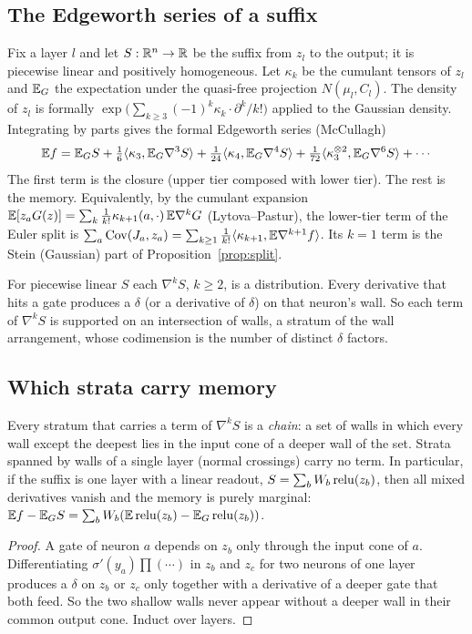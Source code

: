\label{sec:coupling}
\subsection{The Edgeworth series of a suffix}
Fix a layer $l$ and let $S:\mathbb R^n\to\mathbb R$ be the suffix from $z_l$ to the output; it is piecewise linear and positively homogeneous. Let
$\kappa_k$ be the cumulant tensors of $z_l$ and $\mathbb E_G$ the expectation under the quasi-free projection $N(\mu_l,C_l)$. The density of $z_l$
is formally $\exp\big(\sum_{k\ge3}(-1)^k\kappa_k\cdot\partial^k/k!\big)$ applied to the Gaussian density. Integrating by parts gives the
formal Edgeworth series (McCullagh)
\[
\mathbb E f=\mathbb E_GS+\tfrac16\langle\kappa_3,\mathbb E_G\nabla^3S\rangle+\tfrac1{24}\langle\kappa_4,\mathbb E_G\nabla^4S\rangle+\tfrac1{72}\langle\kappa_3^{\otimes2},\mathbb E_G\nabla^6S\rangle+\cdots
\]
The first term is the closure (upper tier composed with lower tier). The rest is the memory. Equivalently, by the cumulant expansion
$\mathbb E[z_aG(z)]=\sum_k\frac1{k!}\kappa_{k+1}(a,\cdot)\,\mathbb E\nabla^kG$ (Lytova--Pastur), the lower-tier term of the Euler split is
$\sum_a\operatorname{Cov}(J_a,z_a)=\sum_{k\ge1}\frac1{k!}\langle\kappa_{k+1},\mathbb E\nabla^{k+1}f\rangle$. Its $k=1$ term is the Stein (Gaussian) part of
Proposition~\ref{prop:split}.

For piecewise linear $S$ each $\nabla^kS$, $k\ge2$, is a distribution. Every derivative that hits a gate produces a $\delta$ (or a
derivative of $\delta$) on that neuron's wall. So each term of $\nabla^kS$ is supported on an intersection of walls, a stratum of the
wall arrangement, whose codimension is the number of distinct $\delta$ factors.

\subsection{Which strata carry memory}
\begin{proposition}\label{prop:chain}
Every stratum that carries a term of $\nabla^kS$ is a \emph{chain}: a set of walls in which every wall except the deepest lies in the
input cone of a deeper wall of the set. Strata spanned by walls of a single layer (normal crossings) carry no term. In particular, if
the suffix is one layer with a linear readout, $S=\sum_bW_b\operatorname{relu}(z_b)$, then all mixed derivatives vanish and the memory is purely
marginal: $\mathbb E f-\mathbb E_GS=\sum_bW_b(\mathbb E\operatorname{relu}(z_b)-\mathbb E_G\operatorname{relu}(z_b))$.
\end{proposition}
\begin{proof}
A gate of neuron $a$ depends on $z_b$ only through the input cone of $a$. Differentiating $\sigma'(y_a)\prod(\cdots)$ in $z_b$ and $z_c$ for two
neurons of one layer produces a $\delta$ on $z_b$ or $z_c$ only together with a derivative of a deeper gate that both feed. So the two
shallow walls never appear without a deeper wall in their common output cone. Induct over layers.
\end{proof}

